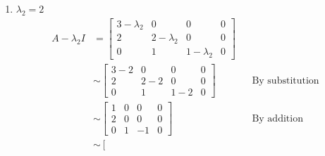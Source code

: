 \documentclass[10pt,letterpaper,final]{report}
\newcommand{\reason}[1]{&& \text{#1}}
\begin{document}
\begin{enumerate}[label=(\alph*)]
\begin{enumerate}
                \begin{figure}[H]
                  \centering
                  \caption{{Basis for the eigenspace $E_{\lambda_i}$ corresponding to $\lambda_1 = 3$}}
                \end{figure}

          \item $\lambda_2 = 2$
                \begin{align*}
                  A - \lambda_2 I & = \left[\begin{array}{rrr|r}
                                          3 - \lambda_2 & 0             & 0             & 0 \\
                                          2             & 2 - \lambda_2 & 0             & 0 \\
                                          0             & 1             & 1 - \lambda_2 & 0
                                        \end{array}\right]      \\[1ex]
                                  & \sim \left[\begin{array}{rrr|r}
                                             3 - 2 & 0     & 0     & 0 \\
                                             2     & 2 - 2 & 0     & 0 \\
                                             0     & 1     & 1 - 2 & 0
                                           \end{array}\right] \reason{By substitution}           \\[1ex]
                                  & \sim \left[\begin{array}{rrr|r}
                                             1 & 0 & 0  & 0 \\
                                             2 & 0 & 0  & 0 \\
                                             0 & 1 & -1 & 0
                                           \end{array}\right] \reason{By addition}               \\[1ex]
                                  & \sim \left[\begin{array}{rrr|r}

\end{array}
\end{align*}
\end{enumerate}
\end{enumerate}
\end{document}
